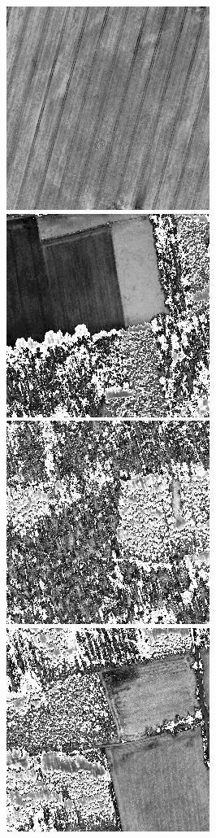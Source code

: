 \begin{figure}
    \vspace{3mm}
    \includegraphics[width=\VegetationIndicesImageWidth]{images/vegetation/msavi/1} \hfill
    \includegraphics[width=\VegetationIndicesImageWidth]{images/vegetation/msavi/2} \hfill
    \includegraphics[width=\VegetationIndicesImageWidth]{images/vegetation/msavi/3} \hfill
    \includegraphics[width=\VegetationIndicesImageWidth]{images/vegetation/msavi/4} \hfill

\end{figure}
